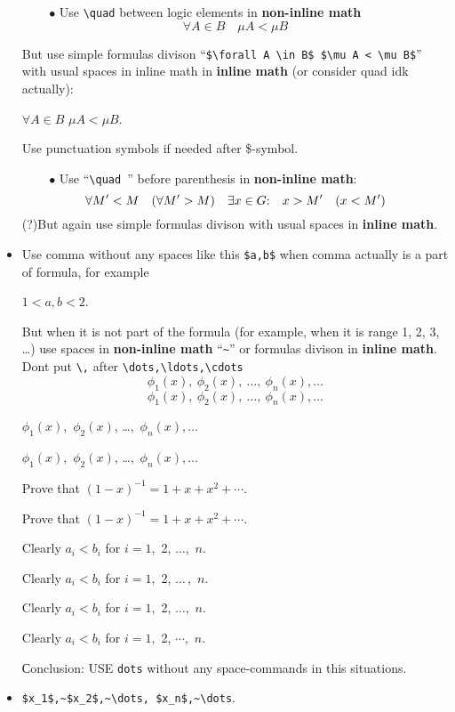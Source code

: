\documentclass[a5paper,openany,9pt]{extbook}
\begin{document}
\begin{itemize}

\item[\colorbox{prpl}{\textcolor{white}{MY}}\ $\bullet$]
Use \verb|\quad| between logic elements in \textbf{non-inline math}
$$
\forall A \in B \quad \mu A < \mu B 
$$

But use simple formulas divison ``\verb=$\forall A \in B$ $\mu A < \mu B$='' with usual spaces in inline math in \textbf{inline math} (or consider quad idk actually): 
\begin{center}
$\forall A \in B$ $\mu A < \mu B$.
\end{center}
Use punctuation symbols if needed after \$-symbol.
\item[\colorbox{prpl}{\textcolor{white}{MY}}\ $\bullet$]
Use ``\verb|\quad |'' before parenthesis in \textbf{non-inline math}:
$$
\forall M' < M \quad (\forall M' > M)\quad \exists x\in G{:}\quad x>M' \quad (x<M')
$$
(?)But again use simple formulas divison with usual spaces in \textbf{inline math}.

\item 
Use comma without any spaces like this \verb|$a,b$| when comma actually is a part of formula, for example
\begin{center}
$1<a,b<2$. 
\end{center}
But when it is not part of the formula (for example, when it is range 1, 2, 3, \dots) use spaces in \textbf{non-inline math} ``\verb|~|'' or formulas divison in \textbf{inline math}. Dont put \verb|\,| after \verb|\dots,\ldots,\cdots|
$$
\phi_1(x), \ \phi_2(x),\ \ldots,\ \phi_n(x), \ldots
$$
$$
\phi_1(x), \ \phi_2(x),\ \dots,\ \phi_n(x), \ldots
$$

$\phi_1(x)$,~$\phi_2(x)$, \ldots,~$\phi_n(x), \ldots$

$\phi_1(x)$,~$\phi_2(x)$, \dots,~$\phi_n(x), \ldots$

Prove that $(1-x)^{-1}=1+x+x^2+\cdots$.

Prove that $(1-x)^{-1}=1+x+x^2+\cdots$.

Clearly $a_i<b_i$ for $i=1$,~2, $\ldots$,~$n$.

Clearly $a_i<b_i$ for $i=1$,~2, $\dots\,$,~$n$.

Clearly $a_i<b_i$ for $i=1$,~2, $\dots$,~$n$.

Clearly $a_i<b_i$ for $i=1$,~2, $\cdots$,~$n$.


Сonclusion: USE \verb|dots| without any space-commands in this situations.


\item 
\verb|$x_1$,~$x_2$,~\dots, $x_n$,~\dots|.


\end{itemize}
\end{document}
